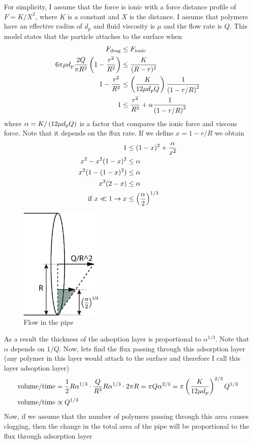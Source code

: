 For simplicity, I assume that the force is ionic with a force distance
profile of $F= K/X^2$, where $K$ is a constant and $X$ is the
distance. I assume that polymers have an effective radius of $d_{p}$
and fluid viscosity is $\mu$ and the flow rate is $Q$. This model
states that the particle attaches to the surface when
\begin{align}
    F_{\text{drag}} &\leq F_{\text{ionic}}\\
    6\pi \mu d_{p} \frac{2Q}{\pi R^2} \left( 1- \frac{r^2}{R^2} \right) & \leq \frac{K}{(R-r)^2} \\
    1 - \frac{r^2}{R^2} & \leq \left( \frac{K }{12 \mu  d_{p} Q} \right) \frac{1}{\left( 1 - r/R \right)^2} \\
    1 & \leq \frac{r^2}{R^2} + \alpha \frac{1}{\left( 1-r/R\right) ^2}
\end{align}
%
where $\alpha = K/\left( 12\mu d_pQ \right)$ is a factor that compares the ionic force and viscous
force. Note that it depends on the flux rate. If we define
$x = 1- r/R$ we obtain
%
\begin{align}
    1 &\leq (1-x)^{2} + \frac{\alpha}{x^2} \\
    x^2- x^2(1-x)^{2} &\leq \alpha \\
    x^2 (1- (1-x)^2) & \leq \alpha \\
    x^3(2-x) & \leq \alpha \\
    \text{if } x\ll1 \to x & \leq \left( \frac{\alpha}{2}\right)^{1/3}
\end{align}
%
%
\begin{figure}[h]
  \centering
  \includegraphics[width=4cm]{./Figs/model2.jpg}
  \caption{Flow in the pipe}
\end{figure}
%
As a result the thickness of the adsoption layer is proportional to
$\alpha^{1/3}$. Note that $\alpha$ depends on $1/Q$.  Now, lets find
the flux passing through this adsorption layer (any polymer in this
layer would attach to the surface and therefore I call this layer
adsoption layer)
%
%
\begin{align}
  \text{volume}/\text{time} &= \frac{1}{2} R \alpha ^{1/3} \cdot \frac{Q}{R^{3}} R\alpha^{1/3} \cdot 2\pi R = \pi Q \alpha^{2/3}  = \pi \left( \frac{K  }{12 \mu  d_{p}} \right)^{2/3} Q^{1/3} \\
  \text{volume}/\text{time} & \propto {Q^{1/3}} 
\end{align}
%
Now, if we assume that the number of polymers passing through this
area causes clogging, then the change in the total area of the pipe
will be proportional to the flux through adsorption layer


